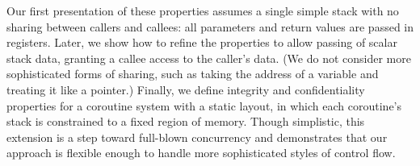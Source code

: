\documentclass[acmsmall,review,anonymous]{acmart}\settopmatter{printfolios=true,printccs=false,printacmref=false}
\begin{document}

Our first presentation of these properties assumes a single simple stack
with no sharing between callers and callees: all parameters and return
values are passed in registers.  Later, we show how to refine the properties to allow
passing of scalar stack data, granting a callee access to the caller's
data. (We do not consider more sophisticated forms of sharing, such as
taking the address of a variable and treating it like a pointer.)
%
Finally, we define integrity and confidentiality properties for a coroutine
system with a static layout, in which each coroutine's stack is constrained
to a fixed region of memory.  Though simplistic, this extension is a step
toward full-blown concurrency and demonstrates that our approach is flexible
enough to handle more sophisticated styles of control flow.



\end{document}
